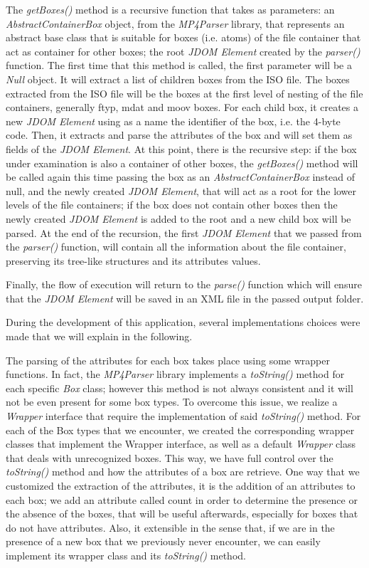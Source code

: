 The \emph{getBoxes()} method is a recursive function that takes as parameters: an \emph{AbstractContainerBox} object, from the \emph{MP4Parser} library, that represents an abstract base class that is suitable for boxes (i.e. atoms) of the file container that act as container for other boxes; the root \emph{JDOM Element} created by the \emph{parser()} function.
The first time that this method is called, the first parameter will be a \emph{Null} object. It will extract a list of children boxes from the ISO file. The boxes extracted from the ISO file will be the boxes at the first level of nesting of the file containers, generally ftyp, mdat and moov boxes.
For each child box, it creates a new \emph{JDOM Element} using as a name the identifier of the box, i.e. the 4-byte code. Then, it extracts and parse the attributes of the box and will set them as fields of the \emph{JDOM Element}. At this point, there is the recursive step: if the box under examination is also a container of other boxes, the \emph{getBoxes()} method will be called again this time passing the box as an \emph{AbstractContainerBox} instead of null, and the newly created \emph{JDOM Element}, that will act as a root for the lower levels of the file containers; if the box does not contain other boxes then the newly created \emph{JDOM Element} is added to the root and a new child box will be parsed.
At the end of the recursion, the first \emph{JDOM Element} that we passed from the \emph{parser()} function, will contain all the information about the file container, preserving its tree-like structures and its attributes values.

Finally, the flow of execution will return to the \emph{parse()} function which will ensure that the \emph{JDOM Element} will be saved in an XML file in the passed output folder.

During the development of this application, several implementations choices were made that we will explain in the following.

The parsing of the attributes for each box takes place using some wrapper functions. In fact, the \emph{MP4Parser} library implements a \emph{toString()} method for each specific \emph{Box} class; however this method is not always consistent and it will not be even present for some box types. To overcome this issue, we realize a \emph{Wrapper} interface that require the implementation of said \emph{toString()} method. For each of the Box types that we encounter, we created the corresponding wrapper classes that implement the Wrapper interface, as well as a default \emph{Wrapper} class that deals with unrecognized boxes. This way, we have full control over the \emph{toString()} method and how the attributes of a box are retrieve. One way that we customized the extraction of the attributes, it is the addition of an attributes to each box; we add an attribute called count in order to determine the presence or the absence of the boxes, that will be useful afterwards, especially for boxes that do not have attributes.
Also, it extensible in the sense that, if we are in the presence of a new box that we previously never encounter, we can easily implement its wrapper class and its \emph{toString()} method.

